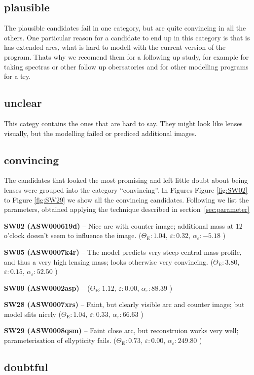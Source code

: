 \documentclass[fleqn,usenatbib]{mnras}
\newcommand{\lenstitle}[1]{\noindent\textbf{#1} --}
\newcommand{\params}[3]{(\(\Theta_\text{E}:#1\), $\varepsilon:#2$, $\alpha_\varepsilon:#3$ )}
\newcommand{\figref}[1]{Figure \ref{fig:#1}}
\begin{document}
\subsection{plausible}

The plausible candidates fail in one category, but are quite convincing in all the others.
One particular reason for a candidate to end up in this category is that is has extended arcs, what is hard to modell with the current version of the program.
Thats why we recomend them for a following up study, for example for taking spectras or other follow up obersatories and for other modelling programs for a try.


\subsection{unclear}

This categy contains the ones that are hard to say.
They might look like lenses visually, but the modelling failed or prediced additional images.


\subsection{convincing}

The candidates that looked the most promising and left little doubt about being lenses were grouped into the category ``convincing''.
In Figures \figref{SW02} to \figref{SW29} we show all the convincing candidates.
Following we list the parameters, obtained applying the technique described in section~\ref{sec:parameter}

\lenstitle{SW02 (ASW000619d)}
Nice arc with counter image;
additional mass at 12 o'clock doesn't seem to influence the image.
\params{1.04}{0.32}{-5.18}

\lenstitle{SW05 (ASW0007k4r)}
The model predicts very steep central mass profile, and thus a very high lensing mass;
looks otherwise very convincing.
\params{3.80}{0.15}{52.50}
  
\lenstitle{SW09 (ASW0002asp)}
\params{1.12}{0.00}{88.39}
  
\lenstitle{SW28 (ASW0007xrs)}
Faint, but clearly visible arc and counter image;
but model sfits nicely
\params{1.04}{0.33}{66.63}
 
\lenstitle{SW29 (ASW0008qsm)}
Faint close arc, but reconstruion works very well;
parameterisation of ellypticity fails.
\params{0.73}{0.00}{249.80}


\subsection{doubtful}
\end{document}
